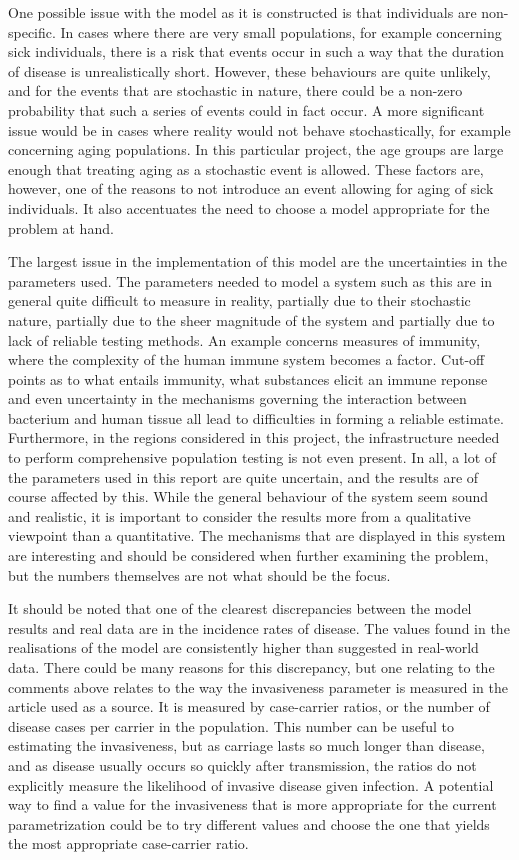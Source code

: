 \documentclass[10pt,a4paper]{article}
\begin{document}
One possible issue with the model as it is constructed is that individuals are non-specific. In cases where there are very small populations, for example concerning sick individuals, there is a risk that events occur in such a way that the duration of disease is unrealistically short. However, these behaviours are quite unlikely, and for the events that are stochastic in nature, there could be a non-zero probability that such a series of events could in fact occur. A more significant issue would be in cases where reality would not behave stochastically, for example concerning aging populations. In this particular project, the age groups are large enough that treating aging as a stochastic event is allowed. These factors are, however, one of the reasons to not introduce an event allowing for aging of sick individuals. It also accentuates the need to choose a model appropriate for the problem at hand.

The largest issue in the implementation of this model are the uncertainties in the parameters used. The parameters needed to model a system such as this are in general quite difficult to measure in reality, partially due to their stochastic nature, partially due to the sheer magnitude of the system and partially due to lack of reliable testing methods. An example concerns measures of immunity, where the complexity of the human immune system becomes a factor. Cut-off points as to what entails immunity, what substances elicit an immune reponse and even uncertainty in the mechanisms governing the interaction between bacterium and human tissue all lead to difficulties in forming a reliable estimate. Furthermore, in the regions considered in this project, the infrastructure needed to perform comprehensive population testing is not even present. In all, a lot of the parameters used in this report are quite uncertain, and the results are of course affected by this. While the general behaviour of the system seem sound and realistic, it is important to consider the results more from a qualitative viewpoint than a quantitative. The mechanisms that are displayed in this system are interesting and should be considered when further examining the problem, but the numbers themselves are not what should be the focus.

It should be noted that one of the clearest discrepancies between the model results and real data are in the incidence rates of disease. The values found in the realisations of the model are consistently higher than suggested in real-world data. There could be many reasons for this discrepancy, but one relating to the comments above relates to the way the invasiveness parameter is measured in the article used as a source. It is measured by case-carrier ratios, or the number of disease cases per carrier in the population. This number can be useful to estimating the invasiveness, but as carriage lasts so much longer than disease, and as disease usually occurs so quickly after transmission, the ratios do not explicitly measure the likelihood of invasive disease given infection. A potential way to find a value for the invasiveness that is more appropriate for the current parametrization could be to try different values and choose the one that yields the most appropriate case-carrier ratio.
\end{document}
